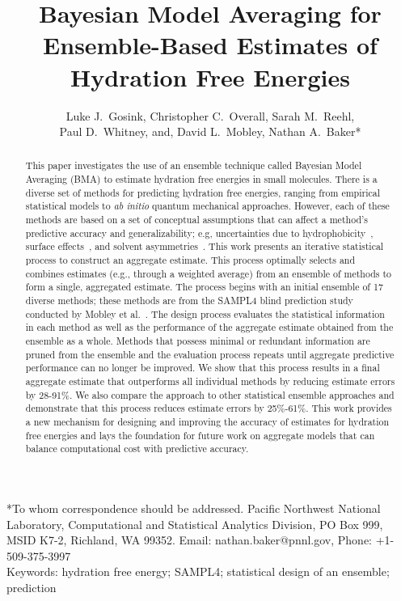 \documentclass[12pt]{article}
\newcommand{\+}[1]{\ensuremath{\mathbf{#1}}}
\begin{document}
\date{}
\title{Bayesian Model Averaging for Ensemble-Based Estimates of Hydration Free Energies}

\author{Luke J.~Gosink, Christopher C.~Overall, Sarah M.~Reehl, \\
Paul D.~Whitney, and, David L.~Mobley, Nathan A.~Baker*}

\maketitle

*To whom correspondence should be addressed. 
 Pacific Northwest National Laboratory,
Computational and Statistical Analytics Division,
 PO Box 999, MSID K7-2,
 Richland, WA 99352.
 Email: nathan.baker@pnnl.gov,
Phone: +1-509-375-3997 \\

Keywords:  hydration free energy;  SAMPL4; statistical design of an ensemble; prediction \\


\begin{abstract} This paper investigates the use of an ensemble technique called Bayesian Model Averaging (BMA) to estimate hydration free energies in small molecules.  There is a diverse set of methods for predicting hydration free energies, ranging from empirical statistical models to {\it ab initio} quantum mechanical approaches.  However, each of these methods are based on a set of conceptual assumptions that can affect a method's predictive accuracy and generalizability; e.g, uncertainties due to hydrophobicity~\cite{Ashbaugh:1999}, surface effects~\cite{Chorny:05}, and solvent asymmetries~\cite{Mobley:08}.  This work presents an iterative statistical process to construct an aggregate estimate. This process optimally selects and combines estimates (e.g., through a weighted average) from an ensemble of methods to form a single, aggregated estimate. The process begins with an initial ensemble of 17 diverse methods; these methods are from the SAMPL4 blind prediction study conducted by Mobley et al.~\cite{Mobley:2014}. The design process evaluates the statistical information in each method as well as the performance of the aggregate estimate obtained from the ensemble as a whole. Methods that possess minimal or redundant information are pruned from the ensemble and the evaluation process repeats until aggregate predictive performance can no longer be improved. We show that this process results in a final aggregate estimate that outperforms all individual methods by reducing estimate errors by 28-91\%.  We also compare the approach to other statistical ensemble approaches and demonstrate that this process reduces estimate errors by 25\%-61\%.  This work provides a new mechanism for designing and improving the accuracy of estimates for hydration free energies and lays the foundation for future work on aggregate models that can balance computational cost with predictive accuracy.  \end{abstract}
\end{document}
